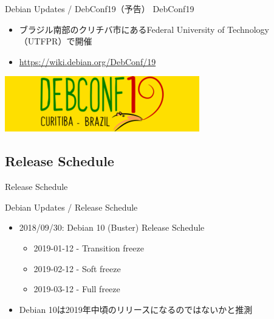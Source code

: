 \documentclass[cjk,dvipdfmx,10pt,compress,%
hyperref={bookmarks=true,bookmarksnumbered=true,bookmarksopen=false,%
colorlinks=false,%
pdftitle={第 132 回 関西 Debian 勉強会},%
pdfauthor={かわだ},%
pdfsubject={資料},%
}]{beamer}
\begin{document}
\begin{frame}{Debian Updates / DebConf19（予告）}%
DebConf19
\begin{itemize}
  \item ブラジル南部のクリチバ市にあるFederal University of Technology（UTFPR）で開催
  \item \url{https://wiki.debian.org/DebConf/19}
\end{itemize}
\includegraphics[scale=1.0]{image201810/dc-19-logo.png}
\end{frame}

\subsection{Release Schedule}
\begin{frame}
  \begin{center}\Huge{Release Schedule}\end{center}
\end{frame}
\begin{frame}{Debian Updates / Release Schedule}%
\begin{itemize}
\item 2018/09/30:  Debian 10 (Buster) Release Schedule
  \begin{itemize}
  \item 2019-01-12 - Transition freeze
  \item 2019-02-12 - Soft freeze
  \item 2019-03-12 - Full freeze
  \end{itemize}
\item Debian 10は2019年中頃のリリースになるのではないかと推測
\end{itemize}
\end{frame}

\end{document}
